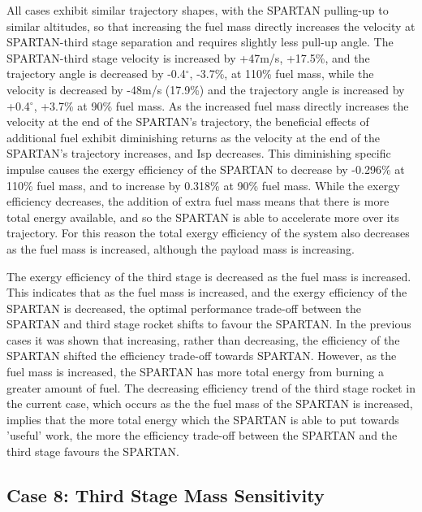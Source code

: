  
All cases exhibit similar trajectory shapes, with the SPARTAN pulling-up to similar altitudes, so that increasing the fuel mass directly increases the velocity at SPARTAN-third stage separation and requires slightly less pull-up angle. The SPARTAN-third stage velocity is increased by +47m/s, +17.5\%, and the trajectory angle is decreased by -0.4$^\circ$, -3.7\%, at 110\% fuel mass, while the velocity is decreased by -48m/s (17.9\%) and the trajectory angle is increased by +0.4$^\circ$, +3.7\% at 90\% fuel mass. 
As the increased fuel mass directly increases the velocity at the end of the SPARTAN's trajectory, the beneficial effects of additional fuel exhibit diminishing returns as the velocity at the end of the SPARTAN's trajectory increases, and Isp decreases.
This diminishing specific impulse causes the exergy efficiency of the SPARTAN to decrease by -0.296\% at 110\% fuel mass, and to increase by 0.318\% at 90\% fuel mass. 
While the exergy efficiency decreases, the addition of extra fuel mass means that there is more total energy available, and so the SPARTAN is able to accelerate more over its trajectory. For this reason the total exergy efficiency of the system also decreases as the fuel mass is increased, although the payload mass is increasing. 

The exergy efficiency of the third stage is decreased as the fuel mass is increased. 
This indicates that as the fuel mass is increased, and the exergy efficiency of the SPARTAN is decreased, the optimal performance trade-off between the SPARTAN and third stage rocket shifts to favour the SPARTAN. 
In the previous cases it was shown that increasing, rather than decreasing, the efficiency of the SPARTAN shifted the efficiency trade-off towards SPARTAN. 
However, as the fuel mass is increased, the SPARTAN has more total energy from burning a greater amount of fuel. 
The decreasing efficiency trend of the third stage rocket in the current case, which occurs as the the fuel mass of the SPARTAN is increased, implies that the more total energy which the SPARTAN is able to put towards 'useful' work, the more the efficiency trade-off between the SPARTAN and the third stage favours the SPARTAN. 

\subsection{Case 8: Third Stage Mass Sensitivity}\label{sec:m3noReturn}

